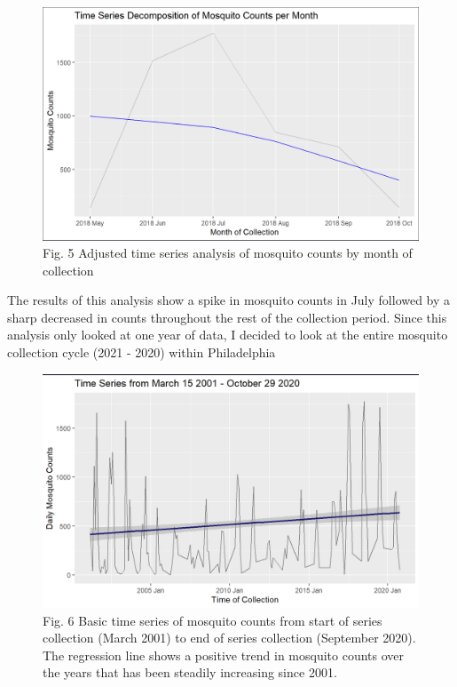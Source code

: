 \documentclass[
  letterpaper,
  DIV=11,
  numbers=noendperiod]{scrartcl}
\begin{document}
\begin{figure}

{\centering \includegraphics{images/Screenshot 2023-12-15 155208.png}

}

\caption{Fig. 5 Adjusted time series analysis of mosquito counts by
month of collection}

\end{figure}

The results of this analysis show a spike in mosquito counts in July
followed by a sharp decreased in counts throughout the rest of the
collection period. Since this analysis only looked at one year of data,
I decided to look at the entire mosquito collection cycle (2021 - 2020)
within Philadelphia

\begin{figure}

{\centering \includegraphics[width=8.33333in,height=\textheight]{images/full_time_series-01.png}

}

\caption{Fig. 6 Basic time series of mosquito counts from start of
series collection (March 2001) to end of series collection (September
2020). The regression line shows a positive trend in mosquito counts
over the years that has been steadily increasing since 2001.}

\end{figure}
\end{document}
